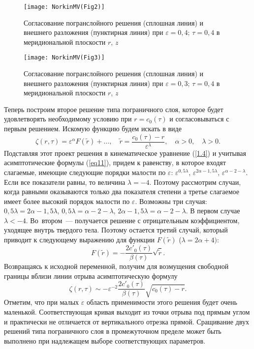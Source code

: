 \documentclass[press]{vestnik}
\begin{document}
\begin{figure}
\centering
\texttt{[image: NorkinMV(Fig2)]}
\caption{Согласование погранслойного решения (сплошная линия) и внешнего 
разложения (пунктирная линия) при $\varepsilon =0,4$; $\tau =0,4$ в 
меридиональной плоскости $r$, $z$}
\label{fig3}
\end{figure}

\begin{figure}
\centering
\texttt{[image: NorkinMV(Fig3)]}
\caption{Согласование погранслойного решения (сплошная линия) и внешнего 
разложения (пунктирная линия) при $\varepsilon =0,3$; $\tau =0,4$ в 
меридиональной плоскости $r$, $z$}
\label{fig4}
\end{figure}

Теперь построим второе решение типа пограничного слоя, которое будет 
удовлетворять необходимому условию при $r=c_{0} (\tau )$ и согласовываться с 
первым решением. Искомую функцию будем искать в виде
\[
\zeta (r,\tau )=\varepsilon^{\alpha }F(\tilde{{r}})+\ldots,
\quad
\tilde{{r}}=\frac{c_{0} (\tau )-r}{\varepsilon^{\lambda }},
\quad
\alpha >0, \quad \lambda >0.
\]
Подставляя этот проект решения в кинематическое уравнение (\ref{1.4}) и учитывая 
асимптотические формулы (\ref{eq11}), придем к равенству, в которое входят 
слагаемые, имеющие следующие порядки малости по $\varepsilon $: $\varepsilon 
^{0,5\lambda }$, $\varepsilon^{2\alpha -1,5\lambda }$, $\varepsilon 
^{\alpha -2-\lambda }$. Если все показатели равны, то величина $\lambda =-4$. 
Поэтому рассмотрим случаи, когда равными оказываются только два показателя 
степени а третье слагаемое имеет более высокий порядок малости по 
$\varepsilon $. Возможны три случая: $0,5\lambda =2\alpha -1,5\lambda $, 
$0,5\lambda =\alpha -2-\lambda $, $2\alpha -1,5\lambda =\alpha -2-\lambda $. 
В первом случае $\lambda <-4$. Во~втором~--- получается решение с отрицательным 
коэффициентом, уходящее внутрь твердого тела. Поэтому остается третий 
случай, который приводит к следующему выражению для функции $F(\tilde{{r}})$ 
($\lambda =2\alpha +4)$:
\[
F(\tilde{{r}})=-\frac{2{c}'_{0} (\tau )}{\beta (\tau )}\sqrt {\tilde{{r}}} .
\]
Возвращаясь к исходной переменной, получим для возмущения свободной границы 
вблизи линии отрыва асимптотическую формулу
\[
\zeta (r,\tau )\sim -\varepsilon^{-2}\frac{2{c}'_{0} (\tau )}{\beta (\tau 
)}\sqrt {c_{0} (\tau )-r} .
\]
Отметим, что при малых $\varepsilon $ область применимости этого решения 
будет очень маленькой. Соответствующая кривая выходит из точки отрыва под 
прямым углом и практически не отличается от вертикального отрезка прямой. 
Сращивание двух решений типа пограничного слоя в промежуточном пределе может 
быть выполнено при надлежащем выборе соответствующих параметров. 
\end{document}
